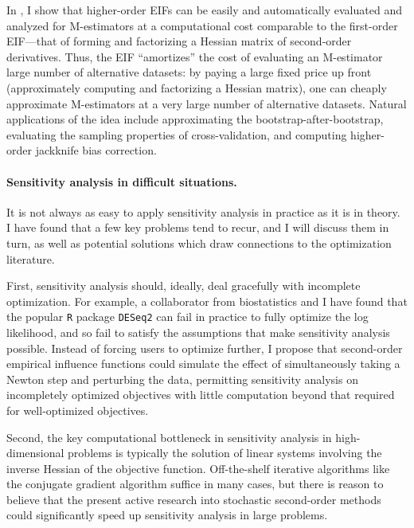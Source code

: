 In \citet{giordano:2019:hoij}, I show that higher-order EIFs can be
easily and automatically evaluated and analyzed for M-estimators at a
computational cost comparable to the first-order EIF---that of forming and
factorizing a Hessian matrix of second-order derivatives.
%
Thus, the EIF ``amortizes'' the cost of evaluating an M-estimator large number
of alternative datasets: by paying a large fixed price up front (approximately
computing and factorizing a Hessian matrix), one can cheaply approximate
M-estimators at a very large number of alternative datasets.  Natural
applications of the idea include approximating the bootstrap-after-bootstrap,
evaluating the sampling properties of cross-validation, and computing
higher-order jackknife bias correction.

\paragraph{Sensitivity analysis in difficult situations.}
%
It is not always as easy to apply sensitivity analysis in practice as it is in
theory.  I have found that a few key problems tend to recur, and I will discuss
them in turn, as well as potential solutions which draw connections to the
optimization literature.

First, sensitivity analysis should, ideally, deal gracefully with incomplete
optimization.  For example, a collaborator from biostatistics and I have found
that the popular \texttt{R} package \texttt{DESeq2} can fail in practice to
fully optimize the log likelihood, and so fail to satisfy the assumptions that
make sensitivity analysis possible.  Instead of forcing users to optimize
further, I propose that second-order empirical influence functions could
simulate the effect of simultaneously taking a Newton step and perturbing the
data, permitting sensitivity analysis on incompletely optimized objectives with
little computation beyond that required for well-optimized objectives.

Second, the key computational bottleneck in sensitivity analysis in
high-dimensional problems is typically the solution of linear systems involving
the inverse Hessian of the objective function. Off-the-shelf iterative
algorithms like the conjugate gradient algorithm %
suffice in many cases, but there is reason to believe that the present active
research into stochastic second-order methods
could significantly speed up sensitivity analysis in large problems.

